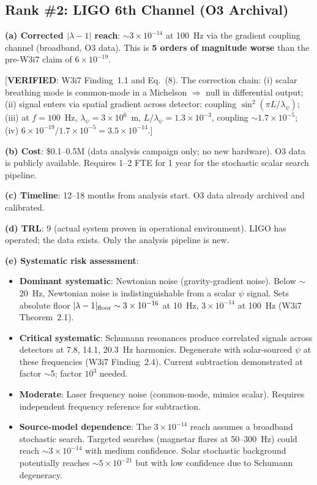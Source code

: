 \documentclass[11pt]{article}
\newcommand{\lam}{\lambda}
\newcommand{\ee}[1]{\times 10^{#1}}
\newcommand{\lbone}{|\lam - 1|}
\theoremstyle{definition}
\theoremstyle{remark}
\begin{document}
\subsection{Rank \#2: LIGO 6th Channel (O3 Archival)}
\label{ssec:rank2}

\begin{tcolorbox}[colback=green!5!white, colframe=green!60!black,
  title=\textbf{RANK \#2: LIGO 6TH CHANNEL (O3 ARCHIVAL)}]

\textbf{(a) Corrected $\lbone$ reach}: $\sim 3\ee{-14}$ at 100~Hz
via the gradient coupling channel (broadband, O3 data). This is
\textbf{5 orders of magnitude worse} than the pre-W3i7 claim of
$6\ee{-19}$.

[\textbf{VERIFIED}: W3i7 Finding~1.1 and Eq.~(8). The correction
chain: (i) scalar breathing mode is common-mode in a Michelson
$\Rightarrow$ null in differential output; (ii) signal enters via
spatial gradient across detector: coupling $\sin^2(\pi L/\lambda_\psi)$;
(iii) at $f = 100$~Hz, $\lambda_\psi = 3\ee{6}$~m,
$L/\lambda_\psi = 1.3\ee{-3}$, coupling $\sim 1.7\ee{-5}$;
(iv) $6\ee{-19}/1.7\ee{-5} = 3.5\ee{-14}$.]

\textbf{(b) Cost}: \$0.1--0.5M (data analysis campaign only; no new
hardware). O3 data is publicly available. Requires 1--2 FTE for 1 year
for the stochastic scalar search pipeline.

\textbf{(c) Timeline}: 12--18 months from analysis start. O3 data
already archived and calibrated.

\textbf{(d) TRL}: 9 (actual system proven in operational environment).
LIGO has operated; the data exists. Only the analysis pipeline is new.

\textbf{(e) Systematic risk assessment}:
\begin{itemize}[nosep]
\item \textbf{Dominant systematic}: Newtonian noise (gravity-gradient
  noise). Below $\sim$20~Hz, Newtonian noise is indistinguishable from
  a scalar $\psi$ signal. Sets absolute floor
  $\lbone_{\rm floor} \sim 3\ee{-16}$ at 10~Hz,
  $3\ee{-14}$ at 100~Hz (W3i7 Theorem~2.1).
\item \textbf{Critical systematic}: Schumann resonances produce
  correlated signals across detectors at 7.8, 14.1, 20.3~Hz harmonics.
  Degenerate with solar-sourced $\psi$ at these frequencies (W3i7
  Finding~2.4). Current subtraction demonstrated at factor $\sim$5;
  factor $10^3$ needed.
\item \textbf{Moderate}: Laser frequency noise (common-mode, mimics scalar).
  Requires independent frequency reference for subtraction.
\item \textbf{Source-model dependence}: The $3\ee{-14}$ reach assumes a
  broadband stochastic search. Targeted searches (magnetar flares at
  50--300~Hz) could reach $\sim 3\ee{-14}$ with medium confidence.
  Solar stochastic background potentially reaches $\sim 5\ee{-21}$ but
  with low confidence due to Schumann degeneracy.
\end{itemize}


\end{tcolorbox}
\end{document}
